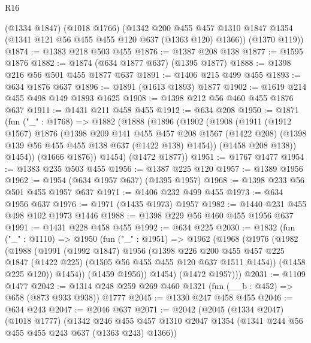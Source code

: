 \begin{lexlean}{R16}
\begin{coremodule}
      (@1334 @1847)
      (@1018 @1766)
      (@1342
        @200
        @455
        @457
        @1310
        @1847
        @1354
        (@1341 @121 @56 @455 @455 @120 @637 (@1363 @120) @1366))
      (@1370 @119))
@1874 := @1383 @218 @503 @455
@1876 := @1387 @208 @138
@1877 := @1595 @1876
@1882 := @1874 (@634 @1877 @637) (@1395 @1877)
@1888 := @1398 @216 @56 @501 @455 @1877 @637
@1891 := @1406 @215 @499 @455
@1893 := @634 @1876 @637
@1896 := @1891 (@1613 @1893) @1877
@1902 := @1619 @214 @455 @498 @149 @1893 @1625
@1908 := @1398 @212 @56 @460 @455 @1876 @637
@1911 := @1431 @211 @458 @455
@1912 := @634 @208
@1950 := @1871
    (fun ("_" : @1768) =>
    @1882
      (@1888
        (@1896
          (@1902
            (@1908
              (@1911
                (@1912 @1567)
                @1876
                (@1398
                  @209
                  @141
                  @455
                  @457
                  @208
                  @1567
                  (@1422 @208)
                  (@1398 @139 @56 @455 @455 @138 @637 (@1422 @138) @1454))
                (@1458 @208 @138))
              @1454))
          (@1666 @1876))
        @1454)
      (@1472 @1877))
@1951 := @1767 @1477
@1954 := @1383 @235 @503 @455
@1956 := @1387 @225 @120
@1957 := @1389 @1956
@1962 := @1954 (@634 @1957 @637) (@1395 @1957)
@1968 := @1398 @233 @56 @501 @455 @1957 @637
@1971 := @1406 @232 @499 @455
@1973 := @634 @1956 @637
@1976 := @1971 (@1435 @1973) @1957
@1982 := @1440 @231 @455 @498 @102 @1973 @1446
@1988 := @1398 @229 @56 @460 @455 @1956 @637
@1991 := @1431 @228 @458 @455
@1992 := @634 @225
@2030 := @1832
    (fun ("_" : @1110) =>
    @1950
      (fun ("_" : @1951) =>
      @1962
        (@1968
          (@1976
            (@1982
              (@1988
                (@1991
                  (@1992 @1847)
                  @1956
                  (@1398
                    @226
                    @200
                    @455
                    @457
                    @225
                    @1847
                    (@1422 @225)
                    (@1505 @56 @455 @455 @120 @637 @1511 @1454))
                  (@1458 @225 @120))
                @1454))
            (@1459 @1956))
          @1454)
        (@1472 @1957)))
@2031 := @1109 @1477
@2042 := @1314 @248 @259 @269 @460 @1321 (fun (__b : @452) => @658 (@873 @933 @938)) @1777
@2045 := @1330 @247 @458 @455
@2046 := @634 @243
@2047 := @2046 @637
@2071 := @2042
    (@2045
      (@1334 @2047)
      (@1018 @1777)
      (@1342
        @246
        @455
        @457
        @1310
        @2047
        @1354
        (@1341 @244 @56 @455 @455 @243 @637 (@1363 @243) @1366))

\end{coremodule}
\end{lexlean}
